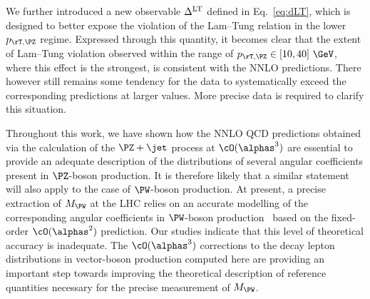 We further introduced a new observable  $\Delta^{\rm LT}$ defined in Eq.~\eqref{eq:dLT}, 
which is designed to better expose the violation of the Lam--Tung relation in the lower $\ptz$ regime. 
Expressed through this quantity, it becomes clear that the extent of Lam--Tung violation observed within the
range of $\ptz \in [10,40]~\GeV$, where this effect is the strongest, is consistent with the NNLO predictions. 
There however still remains some tendency for the data to systematically exceed the corresponding predictions 
at larger \ptz values. More precise data is required to clarify this situation.

Throughout this work, we have shown how the NNLO QCD predictions obtained 
via the calculation of the $\PZ+\jet$ process at $\cO(\alphas^3)$ are essential
to provide an adequate description of the \ptz distributions of several angular coefficients 
present in $\PZ$-boson production. 
It is therefore likely that a similar statement will also apply to
the case of $\PW$-boson production.
%
At present, a precise extraction of $M_{\PW}$ at the LHC relies on an accurate modelling of the corresponding 
angular coefficients in $\PW$-boson production~\cite{Aaboud:2017svj} based
on the fixed-order $\cO(\alphas^2)$ prediction. 
Our studies indicate that this level of theoretical accuracy is inadequate. 
The $\cO(\alphas^3)$ corrections to the decay lepton distributions in vector-boson production computed here are providing 
an important step towards improving the theoretical description of reference quantities necessary for the precise measurement of $M_{\PW}$. 

